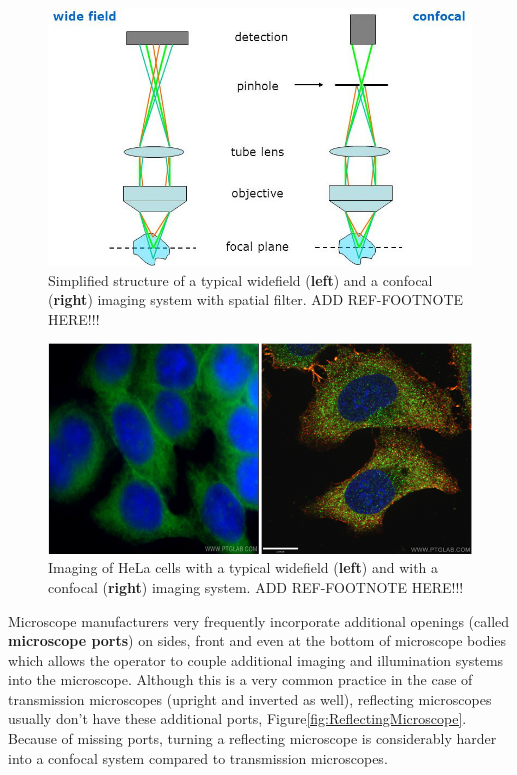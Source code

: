 \begin{figure}[H]
	\centering
	\includegraphics[angle=0,origin=c,width = 1.0\linewidth]{Section_Microscope/Figures/Confocal_microscopy_Basic_principle1.jpg}
	\caption{Simplified structure of a typical widefield (\textbf{left}) and a confocal (\textbf{right})
		imaging system  with spatial filter. ADD REF-FOOTNOTE HERE!!!}
	\label{fig:WidefieldVsConfocal}
\end{figure}

\begin{figure}[H]
	\centering
	\includegraphics[angle=0,origin=c,width = 1.0\linewidth]{Section_Microscope/Figures/EpiVsConfocal1.png}
	\caption{Imaging of HeLa cells with a typical widefield (\textbf{left}) and with a confocal 
		(\textbf{right}) imaging system. ADD REF-FOOTNOTE HERE!!!}
	\label{fig:WidefieldVsConfocalResolution}
\end{figure}

Microscope manufacturers very frequently incorporate additional openings (called \textbf{microscope ports})
on sides, front and even at the bottom of microscope bodies which allows the operator to 
couple additional imaging and illumination systems into the microscope. Although this is 
a very common practice in the case of transmission microscopes (upright and inverted as well),
reflecting microscopes usually don't have these additional ports, Figure\ref{fig:ReflectingMicroscope}. 
Because of missing ports, turning a reflecting microscope is considerably harder into 
a confocal system compared to transmission microscopes. 

